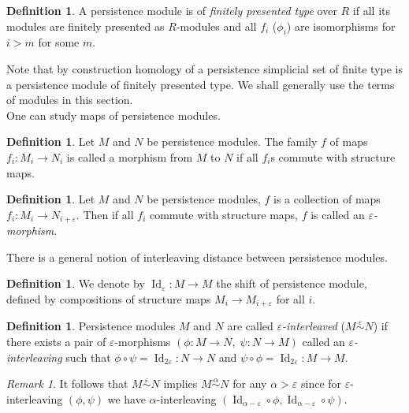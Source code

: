 \documentclass[english,12pt]{article}
\newcounter{stmcounter}[section]
\numberwithin{equation}{section}
\theoremstyle{definition}
\newtheorem{definition}[stmcounter]{Definition}
\theoremstyle{remark}
\newtheorem{remark}[stmcounter]{Remark}
\newcommand{\define}[1]{{\textit{#1}}}
\begin{document}
\begin{definition}
  A persistence module is of \define{finitely presented type} over $R$ if all its modules are finitely presented as $R$-modules and all $f_i$ ($\phi_i$) are isomorphisms for $i > m$ for some $m$.
\end{definition}

Note that by construction homology of a persistence simplicial set of finite type is a persistence module of finitely presented type. We shall generally use the terms of modules in this section.\\

One can study maps of persistence modules. 

\begin{definition}
  Let $M$ and $N$ be persistence modules. The family $f$ of maps $f_i : M_i \to N_i$ is called a morphism from $M$ to $N$ if all $f_i$s commute with structure maps.
\end{definition}

\begin{definition}
  Let $M$ and $N$ be persistence modules, $f$ is a collection of maps $f_i : M_i \to N_{i+\varepsilon}$. Then if all $f_i$ commute with structure maps, $f$ is called an \define{$\varepsilon$-morphism}.
\end{definition}

There is a general notion of interleaving distance between persistence modules.

\begin{definition}
  We denote by $\operatorname{Id}_{\varepsilon} : M \to M$ the shift of persistence module, defined by compositions of structure maps $M_i \to M_{i+\varepsilon}$ for all $i$.
\end{definition}

\begin{definition}
  Persistence modules $M$ and $N$ are called \define{$\varepsilon$-interleaved} ($M \stackrel{\varepsilon}{\sim} N$) if there exists a pair of $\varepsilon$-morphisms $(\phi : M \to N,\;\psi : N \to M)$ called an \define{$\varepsilon$-interleaving} such that $\phi \circ \psi = \operatorname{Id}_{2\varepsilon} : N \to N$ and $\psi \circ \phi = \operatorname{Id}_{2\varepsilon} : M \to M$.\\
\end{definition}

\begin{remark}
  It follows that $M \stackrel{\varepsilon}{\sim} N$ implies $M \stackrel{\alpha}{\sim} N$ for any $\alpha > \varepsilon$ since for $\varepsilon$-interleaving $(\phi, \psi)$ we have $\alpha$-interleaving $(\operatorname{Id}_{\alpha - \varepsilon} \circ \phi, \operatorname{Id}_{\alpha - \varepsilon} \circ \psi)$.
\end{remark}
\end{document}
